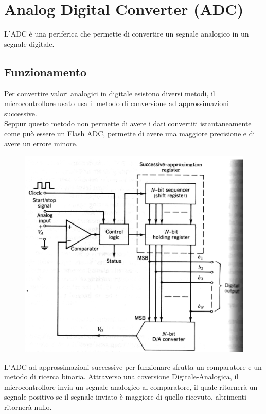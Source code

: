 \pagebreak
\section{Analog Digital Converter (ADC)}
L'ADC è una periferica che permette di convertire un segnale analogico in un segnale digitale. 

\subsection{Funzionamento}
Per convertire valori analogici in digitale esistono diversi metodi, il microcontrollore usato usa il metodo di conversione ad approssimazioni successive.\\

Seppur questo metodo non permette di avere i dati convertiti istantaneamente come può essere un Flash ADC, permette di avere una maggiore precisione e di avere un errore minore.\\

\begin{figure}
    \includegraphics[width=0.8\linewidth]{microcontrollore/assets/ADC.png}
    \label{fig:ADC}
\end{figure}

L'ADC ad approssimazioni successive per funzionare sfrutta un comparatore e un metodo di ricerca binaria. Attraverso una coversione Digitale-Analogica, il microcontrollore invia un segnale analogico al comparatore, il quale ritornerà un segnale positivo se il segnale inviato è maggiore di quello ricevuto, altrimenti ritornerà nullo.\\

